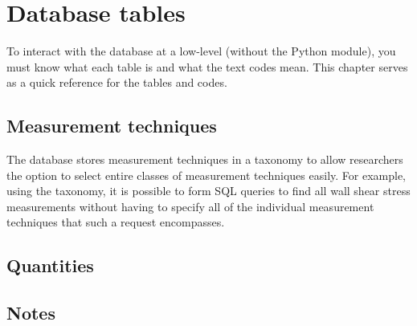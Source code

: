 %
\chapter{Database tables}

To interact with the database at a low-level (without the Python module), you
must know what each table is and what the text codes mean.  This chapter serves
as a quick reference for the tables and codes.


\section{Measurement techniques}

The database stores measurement techniques in a taxonomy to allow researchers
the option to select entire classes of measurement techniques easily.  For
example, using the taxonomy, it is possible to form SQL queries to find all
wall shear stress measurements without having to specify all of the individual
measurement techniques that such a request encompasses.




\section{Quantities}




\section{Notes}


